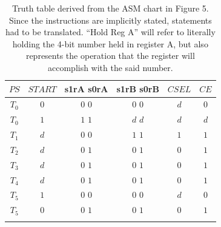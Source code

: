 \documentclass[11pt,a4paper,english]{article}
\begin{document}
   \begin{table}[h!]
      \centering
      \caption{
          Truth table derived from the ASM chart in Figure 5. Since the instructions are implicitly stated, statements had to be translated. ``Hold Reg A'' will refer to literally holding the 4-bit number held in register A, but also represents the operation that the register will accomplish with the said number.
          }
      
        \begin{tabular}{c|c|c|c|c|c}%
          \toprule%
          $ PS $             &        $START$            &        s1rA    s0rA           &        s1rB    s0rB      &          $CSEL$           &           $CE$                   \\
          \midrule%
              $T_0$            &          $0$              &          $0$       $0$        &        $0$      $0$      &          $d$            &           $0$                    \\ \hdashline%
              $T_0$            &          $1$              &          $1$       $1$        &        $d$      $d$      &          $d$            &           $d$                    \\ \hdashline%
              $T_1$            &          $d$              &          $0$       $0$        &        $1$      $1$      &          $1$            &           $1$                    \\ \hdashline%
              $T_2$            &          $d$              &          $0$       $1$        &        $0$      $1$      &          $0$            &           $1$                    \\ \hdashline%
              $T_3$            &          $d$              &          $0$       $1$        &        $0$      $1$      &          $0$            &           $1$                    \\ \hdashline%
              $T_4$            &          $d$              &          $0$       $1$        &        $0$      $1$      &          $0$            &           $1$                    \\ \hdashline%
              $T_5$            &          $1$              &          $0$       $0$        &        $0$      $0$      &          $d$            &           $0$                    \\ \hdashline%
              $T_5$            &          $0$              &          $0$       $1$        &        $0$      $1$      &          $0$            &           $1$                    \\ \hdashline%
        \end{tabular}
      \label{table:1}
   \end{table}
\end{document}
